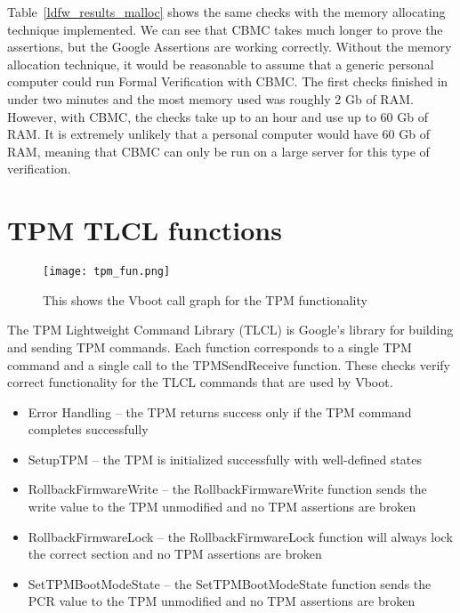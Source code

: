 Table~\ref{ldfw_results_malloc} shows the same checks with the memory allocating technique implemented.
We can see that CBMC takes much longer to prove the assertions, but the Google Assertions are working correctly.
Without the memory allocation technique, it would be reasonable to assume that a generic personal computer could run Formal Verification with CBMC. 
The first checks finished in under two minutes and the most memory used was roughly 2 Gb of RAM.
However, with CBMC, the checks take up to an hour and use up to 60 Gb of RAM.
It is extremely unlikely that a personal computer would have 60 Gb of RAM, meaning that CBMC can only be run on a large server for this type of verification. 

\section{TPM TLCL functions}

\begin{figure}[!htbp]
  \centering
  \texttt{[image: tpm\_fun.png]}
  \caption[TPM Call Graph]{This shows the Vboot call graph for the TPM functionality}\label{fig:tpm_call_graph}
\end{figure}

The TPM Lightweight Command Library (TLCL) is Google's library for building and sending TPM commands.
Each function corresponds to a single TPM command and a single call to the TPMSendReceive function.
These checks verify correct functionality for the TLCL commands that are used by Vboot. 

\begin{itemize}
   \item Error Handling --  the TPM returns success only if the TPM command completes successfully
    \item SetupTPM -- the TPM is initialized successfully with well-defined states
    \item  RollbackFirmwareWrite -- the RollbackFirmwareWrite function sends the write value to the TPM unmodified and no TPM assertions are broken
    \item  RollbackFirmwareLock -- the RollbackFirmwareLock function will always lock the correct section and no TPM assertions are broken
    \item SetTPMBootModeState -- the SetTPMBootModeState function sends the PCR value to the TPM unmodified and no TPM assertions are broken

\end{itemize}

